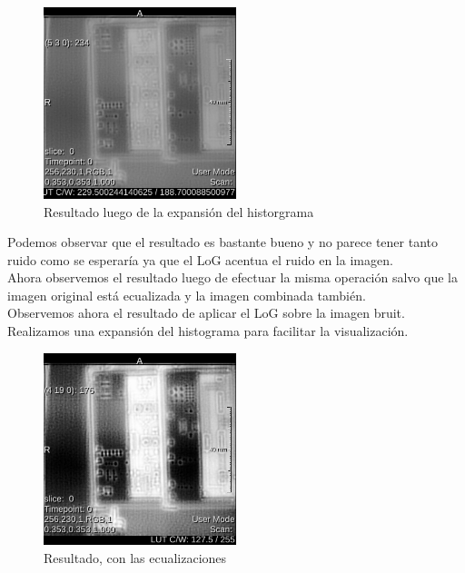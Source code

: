 \documentclass{article}
\begin{document}
\begin{figure}[ht]
\begin{center}
    \includegraphics[width=0.5\textwidth]{3Laplaciano/3_film_6_orig_LoG.png} %
    \caption{Resultado luego de la expansión del historgrama}
\end{center}
\end{figure}
\FloatBarrier

Podemos observar que el resultado es bastante bueno y no parece tener tanto ruido como se esperaría ya que el LoG acentua el ruido en la imagen.\\

Ahora observemos el resultado luego de efectuar la misma operación salvo que la imagen original está ecualizada y la imagen combinada también.\\

Observemos ahora el resultado de aplicar el LoG sobre la imagen bruit. Realizamos una expansión del histograma para facilitar la visualización.\\
\begin{figure}[ht]
\begin{center}
    \includegraphics[width=0.5\textwidth]{3Laplaciano/3_film_ecual_both_scale.png} %
    \caption{Resultado, con las ecualizaciones}
\end{center}
\end{figure}
\FloatBarrier
\end{document}
